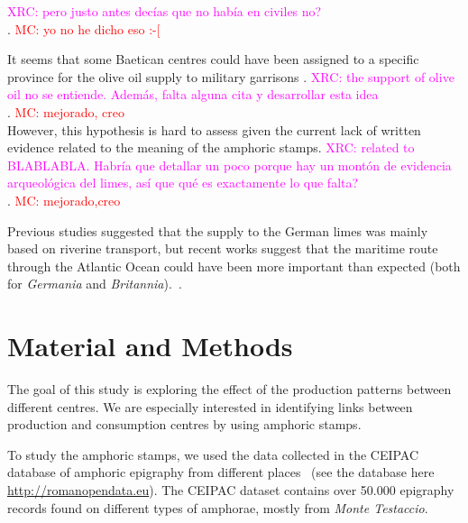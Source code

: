 \documentclass[review]{elsarticle}
\newcommand{\memo}[2]{\textcolor{#1}{#2}}
\newcommand{\maria}[1]{\memo{red}{MC: #1\\}}
\newcommand{\xavi}[1]{\memo{magenta}{XRC: #1\\}}
\begin{document}
\xavi{pero justo antes decías que no había en civiles no?}. 
\maria{yo no he dicho eso :-[}


It seems that some Baetican centres could have been assigned to a specific province for the olive oil supply to military garrisons \citep[125]{remesal_concierto}. 
\xavi{the support of olive oil no se entiende. Además, falta alguna cita y desarrollar esta idea}. 
\maria{mejorado, creo}
However, this hypothesis is hard to assess given the current lack of written evidence related to the meaning of the amphoric stamps. 
\xavi{related to BLABLABLA. Habría que detallar un poco porque hay un montón de evidencia arqueológica del limes, así que qué es exactamente lo que falta?}. 
\maria{mejorado,creo}

Previous studies suggested that the supply to the German limes was mainly based on riverine transport, but recent works suggest that the maritime route through the Atlantic Ocean could have been more important than expected (both for \textit{Germania} and \textit{Britannia}).~\citep{remesal_germn_2010,rubio-campillo_ecology_2018}.



\section{Material and Methods}

The goal of this study is exploring the effect of the production patterns between different centres. We are especially interested in identifying links between production and consumption centres by using amphoric stamps. 


To study the amphoric stamps, we used the data collected in the CEIPAC database of amphoric epigraphy from different places~\citep{remesal_centro_2015} (see the database here \url{http://romanopendata.eu}). The CEIPAC dataset contains over 50.000 epigraphy records found on different types of amphorae, mostly from \textit{Monte Testaccio}. 

\end{document}
